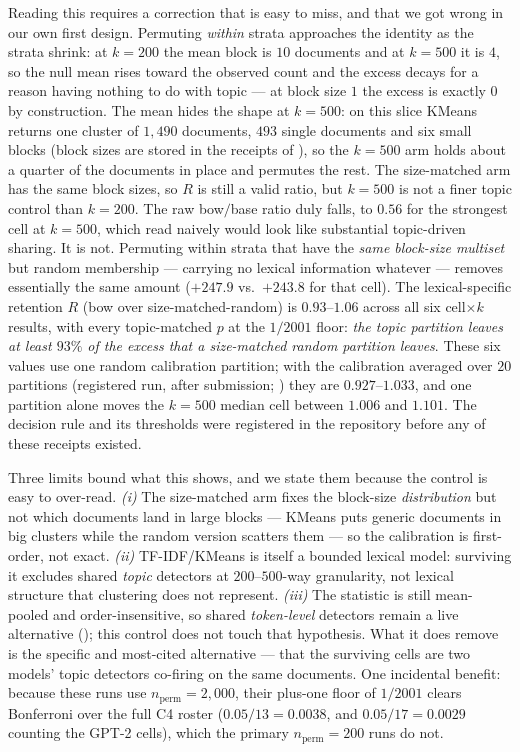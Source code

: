 Reading this requires a correction that is easy to miss, and that we got wrong in our own
first design. Permuting \emph{within} strata approaches the identity as the strata shrink:
at $k{=}200$ the mean block is $10$ documents and at $k{=}500$ it is $4$, so the null mean
rises toward the observed count and the excess decays for a reason having nothing to do with
topic --- at block size $1$ the excess is exactly $0$ by construction. The mean hides the shape at
$k{=}500$: on this slice KMeans returns one cluster of $1{,}490$ documents, $493$ single documents and
six small blocks (block sizes are stored in the receipts of ), so the $k{=}500$ arm
holds about a quarter of the documents in place and permutes the rest. The size-matched arm has the
same block sizes, so $R$ is still a valid ratio, but $k{=}500$ is not a finer topic control than
$k{=}200$. The raw
bow$/$base ratio duly falls, to $0.56$ for the strongest cell at $k{=}500$, which read
naively would look like substantial topic-driven sharing. It is not. Permuting within strata
that have the \emph{same block-size multiset} but random membership --- carrying no lexical
information whatever --- removes essentially the same amount ($+247.9$ vs.\ $+243.8$ for
that cell). The lexical-specific retention $R$ (bow over size-matched-random) is
$0.93$--$1.06$ across all six cell$\times k$ results, with every topic-matched $p$ at the
$1/2001$ floor: \emph{the topic partition leaves at least $93\%$ of the excess that a
size-matched random partition leaves}. These six values use one random calibration partition; with
the calibration averaged over $20$ partitions (registered run, after submission; )
they are $0.927$--$1.033$, and one partition alone moves the $k{=}500$ median cell between $1.006$ and
$1.101$. The decision rule and its thresholds were registered in the
repository before any of these receipts existed.

Three limits bound what this shows, and we state them because the control is easy to
over-read. \emph{(i)} The size-matched arm fixes the block-size \emph{distribution} but not
which documents land in large blocks --- KMeans puts generic documents in big clusters while
the random version scatters them --- so the calibration is first-order, not exact.
\emph{(ii)} TF-IDF/KMeans is itself a bounded lexical model: surviving it excludes shared
\emph{topic} detectors at $200$--$500$-way granularity, not lexical structure that clustering
does not represent. \emph{(iii)} The statistic is still mean-pooled and order-insensitive, so
shared \emph{token-level} detectors remain a live alternative (); this
control does not touch that hypothesis. What it does remove is the specific and most-cited
alternative --- that the surviving cells are two models' topic detectors co-firing on the
same documents. One incidental benefit: because these runs use $n_{\text{perm}}{=}2{,}000$,
their plus-one floor of $1/2001$ clears Bonferroni over the full C4 roster
($0.05/13=0.0038$, and $0.05/17=0.0029$ counting the GPT-2 cells), which the primary
$n_{\text{perm}}{=}200$ runs do not.

